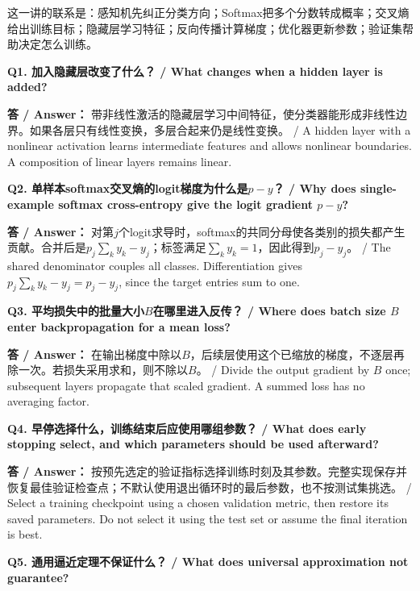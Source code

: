 

这一讲的联系是：感知机先纠正分类方向；Softmax把多个分数转成概率；交叉熵给出训练目标；隐藏层学习特征；反向传播计算梯度；优化器更新参数；验证集帮助决定怎么训练。



\textbf{Q1. 加入隐藏层改变了什么？ / What changes when a hidden layer is added?}


\textbf{答 / Answer：} 带非线性激活的隐藏层学习中间特征，使分类器能形成非线性边界。如果各层只有线性变换，多层合起来仍是线性变换。 / A hidden layer with a nonlinear activation learns intermediate features and allows nonlinear boundaries. A composition of linear layers remains linear.




\textbf{Q2. 单样本softmax交叉熵的logit梯度为什么是\(p-y\)？ / Why does single-example softmax cross-entropy give the logit gradient \(p-y\)?}


\textbf{答 / Answer：} 对第\(j\)个logit求导时，softmax的共同分母使各类别的损失都产生贡献。合并后是\(p_j\sum_k y_k-y_j\)；标签满足\(\sum_k y_k=1\)，因此得到\(p_j-y_j\)。 / The shared denominator couples all classes. Differentiation gives \(p_j\sum_k y_k-y_j=p_j-y_j\), since the target entries sum to one.




\textbf{Q3. 平均损失中的批量大小\(B\)在哪里进入反传？ / Where does batch size \(B\) enter backpropagation for a mean loss?}


\textbf{答 / Answer：} 在输出梯度中除以\(B\)，后续层使用这个已缩放的梯度，不逐层再除一次。若损失采用求和，则不除以\(B\)。 / Divide the output gradient by \(B\) once; subsequent layers propagate that scaled gradient. A summed loss has no averaging factor.




\textbf{Q4. 早停选择什么，训练结束后应使用哪组参数？ / What does early stopping select, and which parameters should be used afterward?}


\textbf{答 / Answer：} 按预先选定的验证指标选择训练时刻及其参数。完整实现保存并恢复最佳验证检查点；不默认使用退出循环时的最后参数，也不按测试集挑选。 / Select a training checkpoint using a chosen validation metric, then restore its saved parameters. Do not select it using the test set or assume the final iteration is best.




\textbf{Q5. 通用逼近定理不保证什么？ / What does universal approximation not guarantee?}



